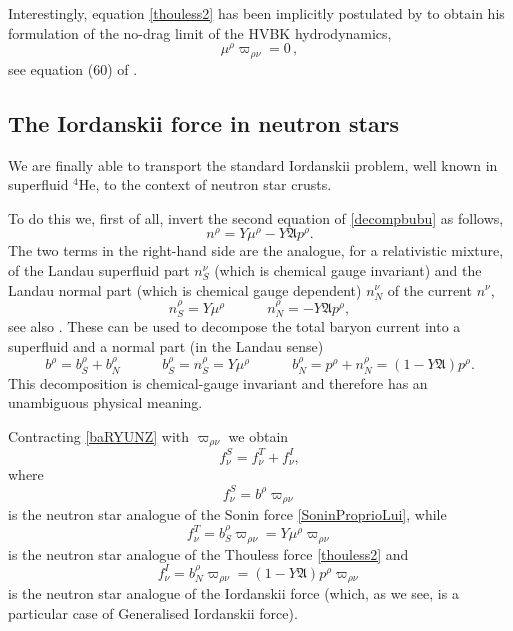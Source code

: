 \documentclass[preprints,article,accept,moreauthors,pdftex]{mdpi}
\newcommand{\spc}{\quad \quad \quad}
\begin{document}
Interestingly, equation \eqref{thouless2} has been implicitly postulated by \citet{GusakovHVBK} to obtain his formulation of the no-drag limit of the HVBK hydrodynamics,
\begin{equation}
\mu^\rho \varpi_{\rho \nu}=0 \, ,
\end{equation}
see equation (60) of \cite{GusakovHVBK}.

\subsection{The Iordanskii force in neutron stars}

We are finally able to transport the standard Iordanskii problem, well known in superfluid $^4$He, to the context of neutron star crusts. 

To do this we, first of all, invert the second equation of \eqref{decompbubu} as follows,
\begin{equation}\label{defnvkfm}
n^\rho = Y \mu^\rho - Y\mathfrak{A} p^\rho.
\end{equation}
The two terms in the right-hand side are the analogue, for a relativistic mixture, of the Landau superfluid part $n_S^\nu$ (which is chemical gauge invariant) and the Landau normal part (which is chemical gauge dependent) $n_N^\nu$ of the current $n^\nu$,
\begin{equation}
n_S^\rho = Y \mu^\rho  \spc n_N^\rho = - Y\mathfrak{A} p^\rho,
\end{equation}
see also \cite{carter92}. These can be used to decompose the total baryon current into a superfluid and a normal part (in the Landau sense) 
\begin{equation}\label{baRYUNZ}
    b^\rho = b_S^\rho + b_N^\rho  \spc b_S^\rho = n_S^\rho = Y \mu^\rho  \spc b_N^\rho =p^\rho+ n_N^\rho =(1 - Y\mathfrak{A}) p^\rho   .
\end{equation}
This decomposition is chemical-gauge invariant and therefore has an unambiguous physical meaning.



Contracting \eqref{baRYUNZ} with $\varpi_{\rho \nu}$ we obtain
\begin{equation}
f^{S}_\nu = f^T_\nu + f^I_\nu,
\end{equation}
where
\begin{equation}
f^{S}_\nu = b^\rho \varpi_{\rho \nu}
\end{equation}
is the neutron star analogue of the Sonin force \eqref{SoninProprioLui}, while
\begin{equation}
f^T_\nu = b_S^\rho \varpi_{\rho \nu}=Y \mu^\rho \varpi_{\rho \nu}
\end{equation}
is the neutron star analogue of the Thouless force \eqref{thouless2} and
\begin{equation}\label{LaIordainfdiemnticalbule}
f^I_\nu = b_N^\rho \varpi_{\rho \nu}= (1- Y\mathfrak{A}) p^\rho \varpi_{\rho \nu}
\end{equation}
is the neutron star analogue of the Iordanskii force (which, as we see, is a particular case of Generalised Iordanskii force).
\end{document}

